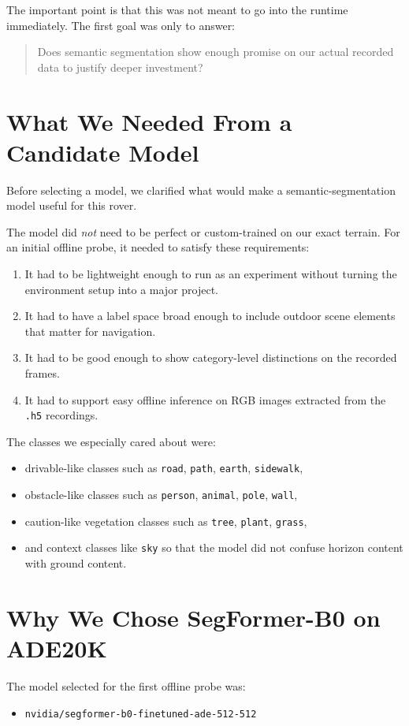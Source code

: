 \documentclass[11pt]{article}
\begin{document}
The important point is that this was not meant to go into the runtime immediately. The first goal was only to answer:
\begin{quote}
Does semantic segmentation show enough promise on our actual recorded data to justify deeper investment?
\end{quote}

\section{What We Needed From a Candidate Model}
Before selecting a model, we clarified what would make a semantic-segmentation model useful for this rover.

The model did \emph{not} need to be perfect or custom-trained on our exact terrain. For an initial offline probe, it needed to satisfy these requirements:
\begin{enumerate}[leftmargin=*]
\item It had to be lightweight enough to run as an experiment without turning the environment setup into a major project.
\item It had to have a label space broad enough to include outdoor scene elements that matter for navigation.
\item It had to be good enough to show category-level distinctions on the recorded frames.
\item It had to support easy offline inference on RGB images extracted from the \texttt{.h5} recordings.
\end{enumerate}

The classes we especially cared about were:
\begin{itemize}[leftmargin=*]
\item drivable-like classes such as \texttt{road}, \texttt{path}, \texttt{earth}, \texttt{sidewalk},
\item obstacle-like classes such as \texttt{person}, \texttt{animal}, \texttt{pole}, \texttt{wall},
\item caution-like vegetation classes such as \texttt{tree}, \texttt{plant}, \texttt{grass},
\item and context classes like \texttt{sky} so that the model did not confuse horizon content with ground content.
\end{itemize}

\section{Why We Chose SegFormer-B0 on ADE20K}
The model selected for the first offline probe was:
\begin{itemize}[leftmargin=*]
\item \texttt{nvidia/segformer-b0-finetuned-ade-512-512}
\end{itemize}
\end{document}
